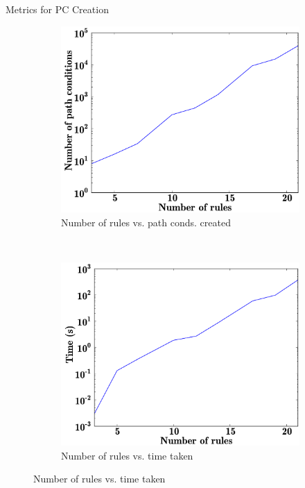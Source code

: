 \documentclass[xcolor=dvipsnames, 14pt]{beamer}
\begin{document}
\begin{frame}{Metrics for PC Creation}
\begin{figure}[htb]
        \centering
        \begin{subfigure}[b]{0.40\textwidth}
                \centering
                \includegraphics[width=1\textwidth]{../figures/results/rules_vs_pcs.pdf}
                \caption{Number of rules vs. path conds. created}
                \label{fig:rules_vs_pcs}
        \end{subfigure}%
        ~~
        \begin{subfigure}[b]{0.40\textwidth}
                \centering
                \includegraphics[width=1\textwidth]{../figures/results/rules_vs_time.pdf}
                \caption{Number of rules vs. time taken}
                \label{fig:rules_vs_time}
        \end{subfigure}%


\end{figure}
\end{frame}
\end{document}
